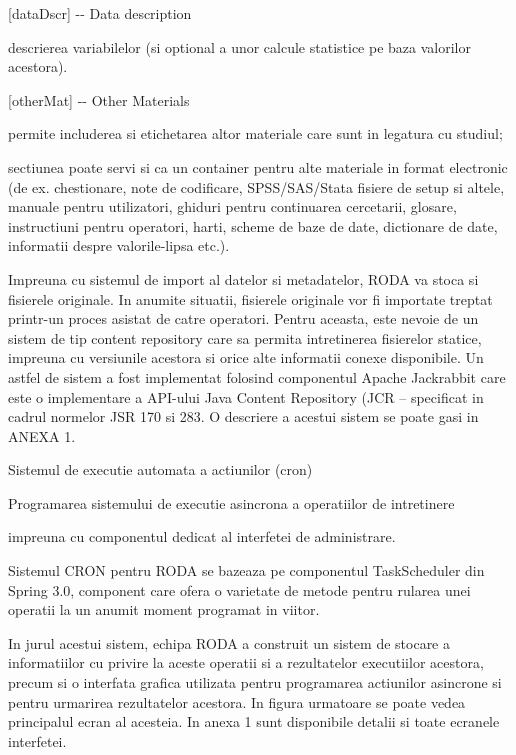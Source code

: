 \documentclass{article}
\begin{document}
\bigskip

[dataDscr] -{}- Data description

descrierea variabilelor (si optional a unor calcule statistice pe baza valorilor acestora).


\bigskip

[otherMat] -{}- Other Materials

permite includerea si etichetarea altor materiale care sunt in legatura cu studiul;

sectiunea poate servi si ca un {\textquotedbl}container{\textquotedbl} pentru alte materiale in format electronic (de ex. chestionare, note de codificare, SPSS/SAS/Stata fisiere de setup si altele, manuale pentru utilizatori, ghiduri pentru continuarea cercetarii, glosare, instructiuni pentru operatori, harti, scheme de baze de date, dictionare de date, informatii despre valorile-lipsa etc.).


\bigskip

Impreuna cu sistemul de import al datelor si metadatelor, RODA va stoca si fisierele originale. In anumite situatii, fisierele originale vor fi importate treptat printr-un proces asistat de catre operatori. Pentru aceasta, este nevoie de un sistem de tip content repository care sa permita intretinerea fisierelor statice, impreuna cu versiunile acestora si orice alte informatii conexe disponibile. Un astfel de sistem a fost implementat folosind componentul Apache Jackrabbit care este o implementare a API{}-ului Java Content Repository (JCR -- specificat in cadrul normelor JSR 170 si 283. O descriere a acestui sistem se poate gasi in ANEXA 1. 


\bigskip

Sistemul de executie automata a actiunilor (cron)


\bigskip

Programarea sistemului de executie asincrona a operatiilor de intretinere

impreuna cu componentul dedicat al interfetei de administrare.


\bigskip

Sistemul CRON pentru RODA se bazeaza pe componentul TaskScheduler din Spring 3.0, component care ofera o varietate de metode pentru rularea unei operatii la un anumit moment programat in viitor. 


\bigskip

In jurul acestui sistem, echipa RODA a construit un sistem de stocare a informatiilor cu privire la aceste operatii si a rezultatelor executiilor acestora, precum si o interfata grafica utilizata pentru programarea actiunilor asincrone si pentru urmarirea rezultatelor acestora. In figura urmatoare se poate vedea principalul ecran al acesteia. In anexa 1 sunt disponibile detalii si toate ecranele interfetei.
\end{document}
